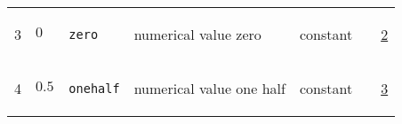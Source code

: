 \begin{longtable}{|p{1cm}|p{2.5cm}|p{4.5cm}|p{8cm}|p{3.0cm}|p{3cm}|p{1cm}|}
            3
             & \hypertarget{"v:3"}{ $ {0}{_{}} $}
             & \verb|zero|
             & numerical value zero
             & \begin{lay}constant \end{lay}
             & $  $
             &                 \hyperlink{"e:2"}{ 2 }
                 \\
            4
             & \hypertarget{"v:4"}{ $ {0.5}{_{}} $}
             & \verb|onehalf|
             & numerical value one half
             & \begin{lay}constant \end{lay}
             & $  $
             &                 \hyperlink{"e:3"}{ 3 }
                 \\
    \end{longtable}